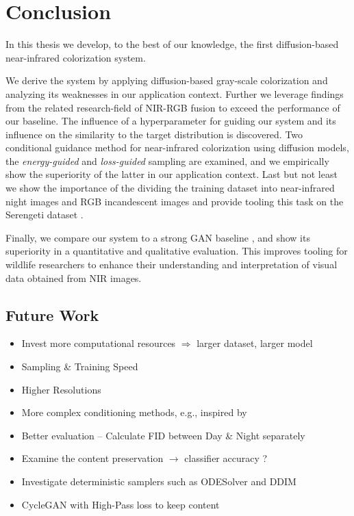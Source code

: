 \chapter{Conclusion}
In this thesis we develop, to the best of our knowledge, the first diffusion-based near-infrared colorization system.

We derive the system by applying diffusion-based gray-scale colorization \parencite{sbgm} and analyzing its weaknesses in our application context.
Further we leverage findings from the related research-field of NIR-RGB fusion \parencite{study-vis-nir-fusion} to exceed the performance of our baseline.
The influence of a hyperparameter for guiding our system and its influence on the similarity to the target distribution is discovered.
Two conditional guidance method for near-infrared colorization using diffusion models, the \textit{energy-guided} and \textit{loss-guided} sampling 
are examined, and we empirically show the superiority of the latter in our application context.
Last but not least we show the importance of the dividing the training dataset into near-infrared night images and RGB incandescent images
and provide tooling this task on the Serengeti dataset \parencite{serengeti}.

Finally, we compare our system to a strong GAN baseline \parencite{mehri}, and show its superiority in a quantitative and qualitative evaluation.
This improves tooling for wildlife researchers to enhance their understanding and interpretation of visual data obtained from NIR images.



\section{Future Work} 
\label{sec:future-work}


\begin{itemize}
    \item Invest more computational resources $\Rightarrow$ larger dataset, larger model 
    \item Sampling \& Training Speed
    \item Higher Resolutions
    \item More complex conditioning methods, e.g., inspired by \textcite{study-vis-nir-fusion}
    \item Better evaluation -- Calculate FID between Day \& Night separately
    \item Examine the content preservation $\rightarrow$ classifier accuracy ?  
    \item Investigate deterministic samplers such as ODESolver \parencite{sbgm} and DDIM \parencite{ddim}
    \item CycleGAN with High-Pass loss to keep content
\end{itemize}